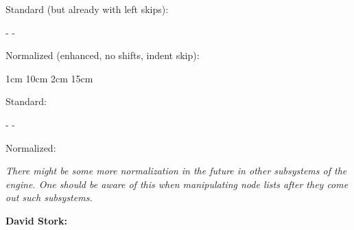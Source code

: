 \typebuffer

Standard (but already with left skips):

\start
    \bitwiseflip \normalizelinemode -
    \bitwiseflip \normalizelinemode -\normalizelinenormalizecode
    \showmakeup \relax \getbuffer
\stop

Normalized (enhanced, no shifts, indent skip):

\start
    \bitwiseflip \normalizelinemode {}
    \bitwiseflip \normalizelinemode \normalizelinenormalizecode
    \showmakeup \relax \getbuffer
\stop

\page

\startbuffer
     1cm 10cm 2cm 15cm    \par
\stopbuffer

\typebuffer

Standard:

\start
    \bitwiseflip \normalizelinemode -
    \bitwiseflip \normalizelinemode -\normalizelinenormalizecode
    \showmakeup \relax \getbuffer
\stop

Normalized:

\start
    \bitwiseflip \normalizelinemode {}
    \bitwiseflip \normalizelinemode \normalizelinenormalizecode
    \showmakeup \relax \getbuffer
\stop


{\em There might be some more normalization in the future in other subsystems of
the engine. One should be aware of this when manipulating node lists after they
come out such subsystems.}

\stoptitle

\starttitle[title=Freezing paragraph properties]

\startbuffer[sample]
\startplacefigure[location=left,number=no]  \stopplacefigure

{\bf David Stork:} 
\stopbuffer

\startbuffer[demo]
\forgetparagraphfreezing \getbuffer[sample]
\stopbuffer

\typebuffer[demo][style=\tt\small] \start \switchtobodyfont[6pt] \getbuffer[demo] \par \stop

\startbuffer[demo]
\setparagraphfreezing    \getbuffer[sample]
\stopbuffer

\typebuffer[demo][style=\tt\small] \start \switchtobodyfont[6pt] \getbuffer[demo] \par \stop

